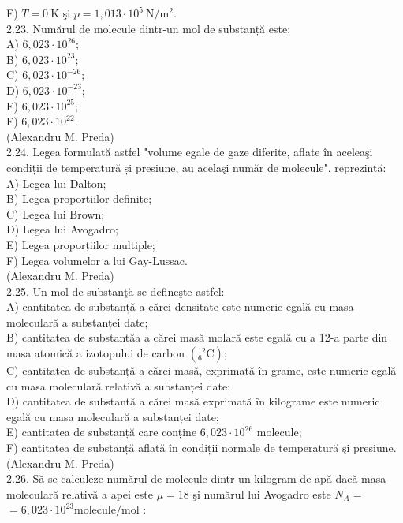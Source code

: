 F) $T=0 \mathrm{~K}$ şi $p=1,013 \cdot 10^{5} \mathrm{~N} / \mathrm{m}^{2}$.\\
2.23. Numărul de molecule dintr-un mol de substanță este:\\
A) $6,023 \cdot 10^{26}$;\\
B) $6,023 \cdot 10^{23}$;\\
C) $6,023 \cdot 10^{-26}$;\\
D) $6,023 \cdot 10^{-23}$;\\
E) $6,023 \cdot 10^{25}$;\\
F) $6,023 \cdot 10^{22}$.\\
(Alexandru M. Preda)\\
2.24. Legea formulată astfel "volume egale de gaze diferite, aflate în aceleaşi condiții de temperatură și presiune, au acelaşi număr de molecule", reprezintă:\\
A) Legea lui Dalton;\\
B) Legea proporțiilor definite;\\
C) Legea lui Brown;\\
D) Legea lui Avogadro;\\
E) Legea proporțiilor multiple;\\
F) Legea volumelor a lui Gay-Lussac.\\
(Alexandru M. Preda)\\
2.25. Un mol de substanţă se defineşte astfel:\\
A) cantitatea de substanță a cărei densitate este numeric egală cu masa moleculară a substanței date;\\
B) cantitatea de substantăa a cărei masă molară este egală cu a 12-a parte din masa atomică a izotopului de carbon $\left({ }_{6}^{12} \mathrm{C}\right)$;\\
C) cantitatea de substanță a cărei masă, exprimată în grame, este numeric egală cu masa moleculară relativă a substanței date;\\
D) cantitatea de substantă a cărei masă exprimată în kilograme este numeric egală cu masa moleculară a substanței date;\\
E) cantitatea de substanță care conține $6,023 \cdot 10^{26}$ molecule;\\
F) cantitatea de substanță aflată în condiții normale de temperatură şi presiune.\\
(Alexandru M. Preda)\\
2.26. Să se calculeze numărul de molecule dintr-un kilogram de apă dacă masa moleculară relativă a apei este $\mu=18$ şi numărul lui Avogadro este $N_{A}=$ $=6,023 \cdot 10^{23} \mathrm{molecule} / \mathrm{mol}$ :\\

